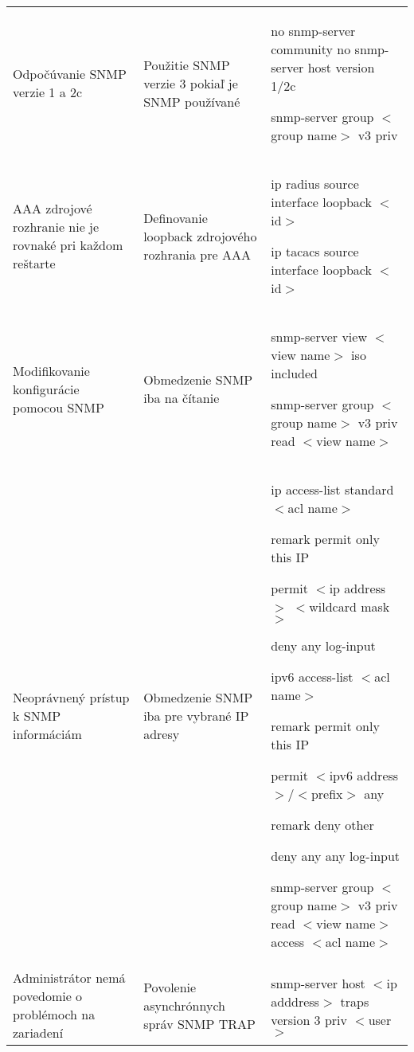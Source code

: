 \begin{longtable}[!htbp]{|L{10em}L{10em}>{\selectfont}L{34em}|}
	
	
	
	Odpočúvanie SNMP verzie 1 a 2c	&Použitie SNMP verzie 3 pokiaľ je SNMP používané	&no snmp-server community
	no snmp-server host  version 1/2c
	
	snmp-server group $<$group name$>$ v3 priv \\
	
	
	
	
	 AAA zdrojové rozhranie nie je rovnaké pri každom reštarte	&Definovanie loopback zdrojového rozhrania pre AAA	&ip radius source interface loopback $<$id$>$
	
	ip tacacs source interface loopback $<$id$>$\\
	
	
	
	
	Modifikovanie konfigurácie pomocou SNMP	&Obmedzenie SNMP iba na čítanie	&snmp-server view $<$view name$>$ iso included
	
	snmp-server group $<$group name$>$ v3 priv read $<$view name$>$\\
	
	
	
	
	 Neoprávnený prístup k SNMP informáciám	&Obmedzenie SNMP iba pre vybrané IP adresy	&ip access-list standard $<$acl name$>$
	
	\hspace{0.5em}remark permit only this IP 
	
	\hspace{0.5em}permit $<$ip address$>$ $<$wildcard mask$>$
	
	\hspace{0.5em}deny any log-input
	\vspace{0.5em}
	
	ipv6 access-list $<$acl name$>$
	
	\hspace{0.5em}remark permit only this IP 
	
	\hspace{0.5em}permit $<$ipv6 address$>$/$<$prefix$>$ any
	
	\hspace{0.5em}remark deny other
	
	\hspace{0.5em}deny any any log-input
	
	snmp-server group $<$group name$>$ v3 priv read $<$view name$>$  access $<$acl name$>$\\
	
	
	
	
	Administrátor nemá povedomie o problémoch na zariadení	&Povolenie asynchrónnych správ SNMP TRAP	&snmp-server host $<$ip adddress$>$ traps version 3 priv $<$user$>$
	

\end{longtable}
